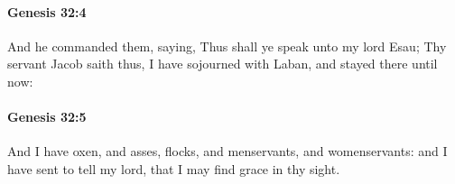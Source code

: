 		\paragraph{Genesis 32:4} %
			\label{GENESIS-32-4}

			And he commanded them, saying, Thus shall ye speak unto my lord Esau; Thy servant Jacob saith thus, I have sojourned with Laban, and stayed there until now:


		\paragraph{Genesis 32:5} %
			\label{GENESIS-32-5}

			And I have oxen, and asses, flocks, and menservants, and womenservants: and I have sent to tell my lord, that I may find grace in thy sight.


